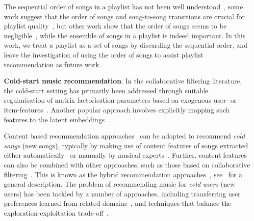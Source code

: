 The sequential order of songs in a playlist has not been well understood~\cite{schedl2017},
some work suggest that the order of songs and song-to-song transitions are crucial
for playlist quality~\cite{mcfee2012hypergraph,kamehkhosh2018automated},
but other work show that the order of songs seems to be negligible~\cite{tintarev2017sequences,vall2017importance},
while the ensemble of songs in a playlist is indeed important.
In this work, we treat a playlist as a set of songs by discarding the sequential order,
and leave the investigation of using the order of songs to assist playlist recommendation as future work.




%


{\bf Cold-start music recommendation}.
In the collaborative filtering literature,
the cold-start setting has primarily been addressed through
suitable regularisation of matrix factorisation parameters
based on exogenous user- or item-features~\cite{Ma:2008,Agarwal:2009,Cao:2010}.
Another popular approach involves explicitly mapping such features to the latent embeddings~\cite{Gantner:2010}.

Content based recommendation approaches~\cite[Chapter~4]{aggarwal2016recommender}
can be adopted to recommend {\it cold songs} (\ie new songs),
typically by making use of content features of songs extracted either automatically~\cite{seyerlehner2010automatic,eghbal2015vectors}
or manually by musical experts~\cite{john2006pandora}.
Further, content features can also be combined with other approaches, such as those based on 
collaborative filtering~\cite{yoshii2006hybrid,donaldson2007hybrid,shao2009music}.
This is known as the hybrid recommendation approaches~\cite{burke2002hybrid}, 
see~\cite[Chapter~6]{aggarwal2016recommender} for a general description. %
The problem of recommending music for {\it cold users} (\ie new users) 
has been tackled by a number of approaches, including transferring user preferences learned 
from related domains~\cite{hu2010study,aizenberg2012build},
and techniques that balance the exploration-exploitation trade-off~\cite{wang2014exploration,liebman2015dj}.
